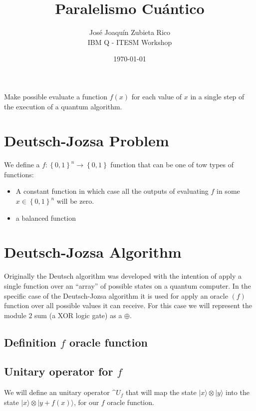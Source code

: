 \documentclass[12pt,letterpaper]{article}
\title{Paralelismo Cuántico}
\author{José Joaquín Zubieta Rico\\IBM Q \-- ITESM Workshop}
\date{\today}
\begin{document}
\maketitle

    Make possible evaluate a function $f(x)$ for each value of $x$ in a single step of the execution of a quantum algorithm.

    \section*{Deutsch-Jozsa Problem}

        We define a $f:{\left\{0,1\right\}}^{n}\rightarrow\left\{0,1\right\}$ function that can be one of tow types of functions:
        \begin{itemize}
            \item   A constant function in which case all the outputs of evaluating $f$ in some $x \in {\left\{0,1\right\}}^n$ will be zero.
            \item   a balanced function 
        \end{itemize}

    \section*{Deutsch-Jozsa Algorithm}

        Originally the Deutsch algorithm was developed with the intention of apply a single function over an ``array'' of possible states on a quantum computer. In the specific case of the Deutsch-Jozsa algorithm it is used for apply an oracle $(f)$ function over all possible values it can receive.
        For this case we will represent the module $2$ sum (a XOR logic gate) as a $\oplus$.

        \subsection*{Definition $f$ oracle function}

        \subsection*{Unitary operator for $f$}

            We will define an unitary operator $\^{U}_f$ that will map the state $|x\rangle\otimes|y\rangle$ into the state $|x\rangle\otimes|y+f(x)\rangle$, for our $f$ oracle function.
\end{document}
